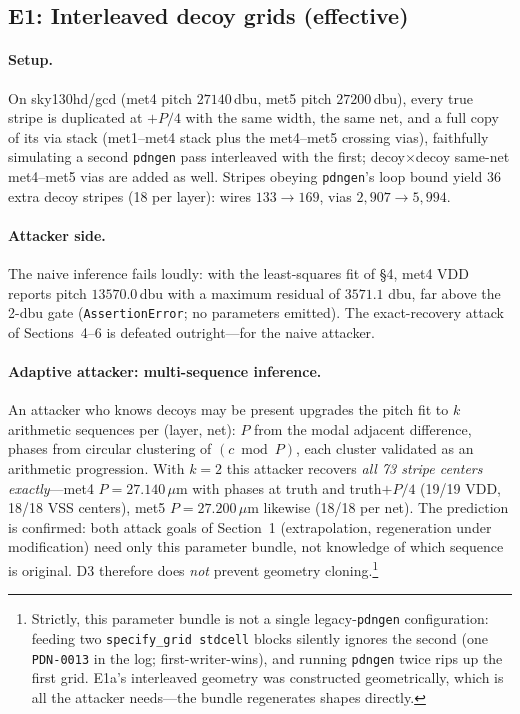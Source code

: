 \documentclass[11pt]{article}
\begin{document}
\subsection{E1: Interleaved decoy grids (effective)}

\paragraph{Setup.} On sky130hd/gcd (met4 pitch $27140$\,dbu, met5 pitch
$27200$\,dbu), every true stripe is duplicated at $+P/4$ with the same
width, the same net, and a full copy of its via stack (met1--met4 stack
plus the met4--met5 crossing vias), faithfully simulating a second
\texttt{pdngen} pass interleaved with the first; decoy$\times$decoy
same-net met4--met5 vias are added as well.  Stripes obeying
\texttt{pdngen}'s loop bound yield 36 extra decoy stripes (18 per layer):
wires $133 \to 169$, vias $2{,}907 \to 5{,}994$.

\paragraph{Attacker side.} The naive inference fails loudly: with the
least-squares fit of \S4, met4 VDD reports pitch $13570.0$\,dbu with a
maximum residual of $3571.1$ dbu, far above the 2-dbu gate
(\texttt{AssertionError}; no parameters emitted).  The exact-recovery
attack of Sections~4--6 is defeated outright---for the naive attacker.

\paragraph{Adaptive attacker: multi-sequence inference.} An attacker who
knows decoys may be present upgrades the pitch fit to $k$ arithmetic
sequences per (layer, net): $P$ from the modal adjacent difference,
phases from circular clustering of $(c \bmod P)$, each cluster validated
as an arithmetic progression.  With $k=2$ this attacker recovers
\emph{all 73 stripe centers exactly}---met4 $P = 27.140\,\mu\mathrm{m}$
with phases at truth and truth$+P/4$ (19/19 VDD, 18/18 VSS centers), met5
$P = 27.200\,\mu\mathrm{m}$ likewise (18/18 per net).  The prediction is
confirmed: both attack goals of Section~1 (extrapolation, regeneration
under modification) need only this parameter bundle, not knowledge of
which sequence is original.  D3 therefore does \emph{not} prevent
geometry cloning.\footnote{Strictly, this parameter bundle is not a
single legacy-\texttt{pdngen} configuration: feeding two
\texttt{specify\_grid stdcell} blocks silently ignores the second (one
\texttt{PDN-0013} in the log; first-writer-wins), and running
\texttt{pdngen} twice rips up the first grid.  E1a's interleaved geometry
was constructed geometrically, which is all the attacker needs---the
bundle regenerates shapes directly.}
\end{document}
